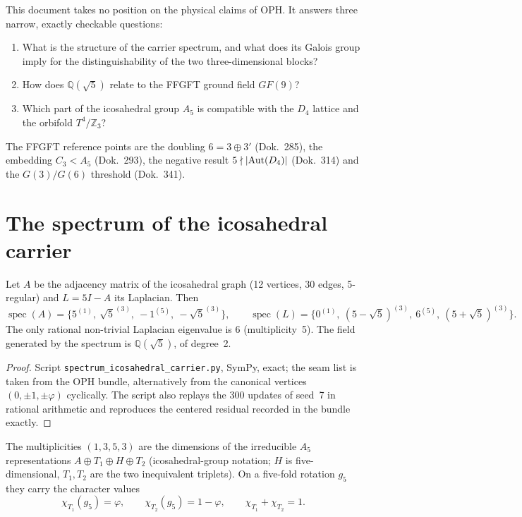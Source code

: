This document takes no position on the physical claims of OPH. It answers
three narrow, exactly checkable questions:
\begin{enumerate}[nosep]
\item What is the structure of the carrier spectrum, and what does its
      Galois group imply for the distinguishability of the two
      three-dimensional blocks?
\item How does $\mathbb{Q}(\sqrt5)$ relate to the FFGFT ground field $GF(9)$?
\item Which part of the icosahedral group $A_5$ is compatible with the
      $D_4$ lattice and the orbifold $T^4/\mathbb{Z}_3$?
\end{enumerate}
The FFGFT reference points are the doubling $6=3\oplus3'$ (Dok.~285), the
embedding $C_3<A_5$ (Dok.~293), the negative result $5\nmid|{\rm Aut}(D_4)|$
(Dok.~314) and the $G(3)/G(6)$ threshold (Dok.~341).

\section{The spectrum of the icosahedral carrier}

\begin{theorem}[Spectrum, \EM/\BM]\label{thm:spektrum}
Let $A$ be the adjacency matrix of the icosahedral graph (12 vertices,
30 edges, 5-regular) and $L=5I-A$ its Laplacian. Then
\[
  \operatorname{spec}(A)=\{5^{(1)},\ \sqrt5^{(3)},\ -1^{(5)},\ -\sqrt5^{(3)}\},\qquad
  \operatorname{spec}(L)=\{0^{(1)},\ (5-\sqrt5)^{(3)},\ 6^{(5)},\ (5+\sqrt5)^{(3)}\}.
\]
The only rational non-trivial Laplacian eigenvalue is $6$ (multiplicity~5).
The field generated by the spectrum is $\mathbb{Q}(\sqrt5)$, of degree~2.
\end{theorem}

\begin{proof}
Script \texttt{spectrum\_icosahedral\_carrier.py}, SymPy, exact; the seam
list is taken from the OPH bundle, alternatively from the canonical
vertices $(0,\pm1,\pm\varphi)$ cyclically. The script also replays the 300
updates of seed~7 in rational arithmetic and reproduces the centered
residual recorded in the bundle exactly.
\end{proof}

The multiplicities $(1,3,5,3)$ are the dimensions of the irreducible
$A_5$ representations $A\oplus T_1\oplus H\oplus T_2$ (icosahedral-group
notation; $H$ is five-dimensional, $T_1,T_2$ are the two inequivalent
triplets). On a five-fold rotation $g_5$ they carry the character values
\[
  \chi_{T_1}(g_5)=\varphi,\qquad \chi_{T_2}(g_5)=1-\varphi,\qquad
  \chi_{T_1}+\chi_{T_2}=1 .
\]

